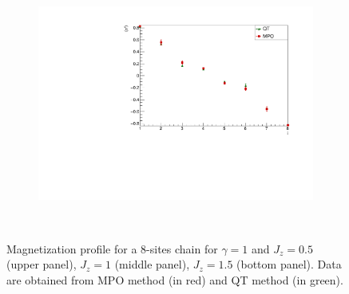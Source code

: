\begin{figure}
\begin{subfigure}{\columnwidth}
        \label{fig:LMComparison_8sJ1051}
        \end{subfigure}\\
        \begin{subfigure}{\columnwidth}
        \centering
        \includegraphics[scale=0.5]{Figures/LMComparison_8sJ10515.pdf}
        \label{fig:LMComparison_8sJ10515}
        \end{subfigure}\\
    \captionsetup{width=1.\linewidth}
    \caption{Magnetization profile for a 8-sites chain for $\gamma = 1$ and $J_z = 0.5$ (upper panel), $J_z = 1$ (middle panel), $J_z = 1.5$ (bottom panel). Data are obtained from MPO method (in red) and QT method (in green).}
    \label{fig:my_label}
\end{figure}


